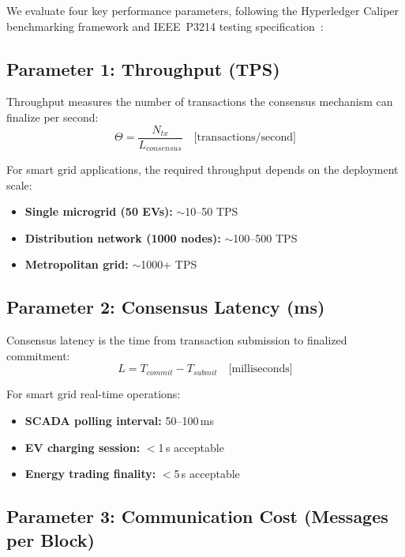 \documentclass[10pt,twocolumn,letterpaper]{article}
\begin{document}
We evaluate four key performance parameters, following the Hyperledger Caliper~\cite{caliper2023} benchmarking framework and IEEE~P3214 testing specification~\cite{ieeep3214}:

\subsection{Parameter 1: Throughput (TPS)}

Throughput measures the number of transactions the consensus mechanism can finalize per second:
\begin{equation}
\Theta = \frac{N_{tx}}{L_{consensus}} \quad \text{[transactions/second]}
\end{equation}

For smart grid applications, the required throughput depends on the deployment scale:
\begin{itemize}[leftmargin=*]
    \item \textbf{Single microgrid (50 EVs):} $\sim$10--50 TPS
    \item \textbf{Distribution network (1000 nodes):} $\sim$100--500 TPS
    \item \textbf{Metropolitan grid:} $\sim$1000+ TPS
\end{itemize}

\subsection{Parameter 2: Consensus Latency (ms)}

Consensus latency is the time from transaction submission to finalized commitment:
\begin{equation}
L = T_{commit} - T_{submit} \quad \text{[milliseconds]}
\end{equation}

For smart grid real-time operations:
\begin{itemize}[leftmargin=*]
    \item \textbf{SCADA polling interval:} 50--100\,ms
    \item \textbf{EV charging session:} $<$1\,s acceptable
    \item \textbf{Energy trading finality:} $<$5\,s acceptable
\end{itemize}

\subsection{Parameter 3: Communication Cost (Messages per Block)}
\end{document}
